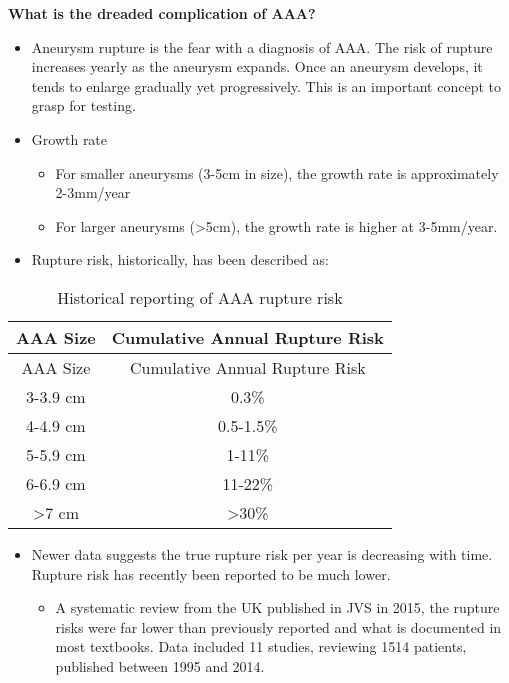\documentclass[
]{book}
\providecommand{\tightlist}{%
  \setlength{\itemsep}{0pt}\setlength{\parskip}{0pt}}
\begin{document}
\textbf{What is the dreaded complication of AAA?}

\begin{itemize}
\item
  Aneurysm rupture is the fear with a diagnosis of AAA. The risk of
  rupture increases yearly as the aneurysm expands. Once an aneurysm
  develops, it tends to enlarge gradually yet progressively. This is
  an important concept to grasp for testing.\citep{lindsay2019, tracci}
\item
  Growth rate

  \begin{itemize}
  \item
    For smaller aneurysms (3-5cm in size), the growth rate is
    approximately 2-3mm/year
  \item
    For larger aneurysms (\textgreater5cm), the growth rate is higher at
    3-5mm/year.
  \end{itemize}
\item
  Rupture risk, historically, has been described as:
\end{itemize}

\begin{longtable}[]{@{}cc@{}}
\caption{Historical reporting of AAA rupture risk\citep{tracci}}\tabularnewline
\toprule()
AAA Size & Cumulative Annual Rupture Risk \\
\midrule()
\endfirsthead
\toprule()
AAA Size & Cumulative Annual Rupture Risk \\
\midrule()
\endhead
3-3.9 cm & 0.3\% \\
4-4.9 cm & 0.5-1.5\% \\
5-5.9 cm & 1-11\% \\
6-6.9 cm & 11-22\% \\
\textgreater7 cm & \textgreater30\% \\
\bottomrule()
\end{longtable}

\begin{itemize}
\item
  Newer data suggests the true rupture risk per year is decreasing
  with time. Rupture risk has recently been reported to be much lower.

  \begin{itemize}
  \tightlist
  \item
    A systematic review from the UK published in JVS in 2015, the
    rupture risks were far lower than previously reported and what
    is documented in most textbooks. Data included 11 studies,
    reviewing 1514 patients, published between 1995 and
    2014.\citep{parkinsonRuptureRatesUntreated2015}
  \end{itemize}
\end{itemize}
\end{document}
